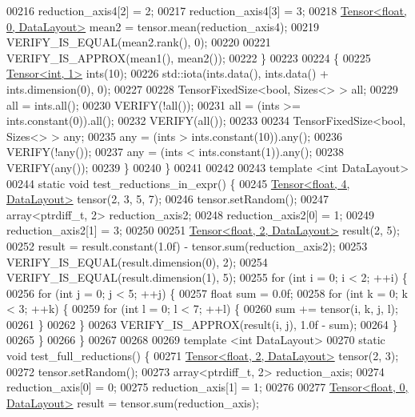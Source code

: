 \begin{DoxyCode}
00216     reduction\_axis4[2] = 2;
00217     reduction\_axis4[3] = 3;
00218     \hyperlink{class_eigen_1_1_tensor}{Tensor<float, 0, DataLayout>} mean2 = tensor.mean(reduction\_axis4);
00219     VERIFY\_IS\_EQUAL(mean2.rank(), 0);
00220 
00221     VERIFY\_IS\_APPROX(mean1(), mean2());
00222   \}
00223 
00224   \{
00225     \hyperlink{class_eigen_1_1_tensor}{Tensor<int, 1>} ints(10);
00226     std::iota(ints.data(), ints.data() + ints.dimension(0), 0);
00227 
00228     TensorFixedSize<bool, Sizes<> > all;
00229     all = ints.all();
00230     VERIFY(!all());
00231     all = (ints >= ints.constant(0)).all();
00232     VERIFY(all());
00233 
00234     TensorFixedSize<bool, Sizes<> > any;
00235     any = (ints > ints.constant(10)).any();
00236     VERIFY(!any());
00237     any = (ints < ints.constant(1)).any();
00238     VERIFY(any());
00239   \}
00240 \}
00241 
00242 
00243 \textcolor{keyword}{template} <\textcolor{keywordtype}{int} DataLayout>
00244 \textcolor{keyword}{static} \textcolor{keywordtype}{void} test\_reductions\_in\_expr() \{
00245   \hyperlink{class_eigen_1_1_tensor}{Tensor<float, 4, DataLayout>} tensor(2, 3, 5, 7);
00246   tensor.setRandom();
00247   array<ptrdiff\_t, 2> reduction\_axis2;
00248   reduction\_axis2[0] = 1;
00249   reduction\_axis2[1] = 3;
00250 
00251   \hyperlink{class_eigen_1_1_tensor}{Tensor<float, 2, DataLayout>} result(2, 5);
00252   result = result.constant(1.0f) - tensor.sum(reduction\_axis2);
00253   VERIFY\_IS\_EQUAL(result.dimension(0), 2);
00254   VERIFY\_IS\_EQUAL(result.dimension(1), 5);
00255   \textcolor{keywordflow}{for} (\textcolor{keywordtype}{int} i = 0; i < 2; ++i) \{
00256     \textcolor{keywordflow}{for} (\textcolor{keywordtype}{int} j = 0; j < 5; ++j) \{
00257       \textcolor{keywordtype}{float} sum = 0.0f;
00258       \textcolor{keywordflow}{for} (\textcolor{keywordtype}{int} k = 0; k < 3; ++k) \{
00259         \textcolor{keywordflow}{for} (\textcolor{keywordtype}{int} l = 0; l < 7; ++l) \{
00260           sum += tensor(i, k, j, l);
00261         \}
00262       \}
00263       VERIFY\_IS\_APPROX(result(i, j), 1.0f - sum);
00264     \}
00265   \}
00266 \}
00267 
00268 
00269 \textcolor{keyword}{template} <\textcolor{keywordtype}{int} DataLayout>
00270 \textcolor{keyword}{static} \textcolor{keywordtype}{void} test\_full\_reductions() \{
00271   \hyperlink{class_eigen_1_1_tensor}{Tensor<float, 2, DataLayout>} tensor(2, 3);
00272   tensor.setRandom();
00273   array<ptrdiff\_t, 2> reduction\_axis;
00274   reduction\_axis[0] = 0;
00275   reduction\_axis[1] = 1;
00276 
00277   \hyperlink{class_eigen_1_1_tensor}{Tensor<float, 0, DataLayout>} result = tensor.sum(reduction\_axis);

\end{DoxyCode}
